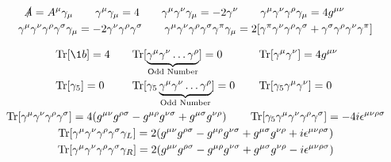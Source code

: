 \begin{gather*}
    \slashed{A} = A^\mu\gamma_\mu
    \qquad
    \gamma^\mu\gamma_\mu = 4
    \qquad
    \gamma^\mu\gamma^\nu\gamma_\mu = -2\gamma^\nu
    \qquad
    \gamma^\mu\gamma^\nu\gamma^\rho\gamma_\mu = 4g^{\mu\nu}
    \qquad
    \\
    \gamma^\mu\gamma^\nu\gamma^\rho\gamma^\sigma\gamma_\mu = -2\gamma^\nu\gamma^\rho\gamma^\sigma
    \qquad
    \gamma^\mu\gamma^\nu\gamma^\rho\gamma^\sigma\gamma^\pi\gamma_\mu = 2\qty[\gamma^\pi\gamma^\nu\gamma^\rho\gamma^\sigma + \gamma^\sigma\gamma^\rho\gamma^\nu\gamma^\pi]
\end{gather*}

\begin{gather*}
    \begin{alignedat}{3}
        &\Tr[\1b] = 4
        \qquad
        &&\mathrm{Tr}[\underbrace{\gamma^\mu\gamma^\nu\dots\gamma^\rho}_{\mathclap{\text{Odd Number}}}] = 0
        \qquad
        &&\Tr[\gamma^\mu\gamma^\nu] = 4g^{\mu\nu}
        \\
        &\Tr[\gamma_5] = 0
        \qquad
        &&\mathrm{Tr}[\gamma_5\underbrace{\gamma^\mu\gamma^\nu\dots\gamma^\rho}_{\mathclap{\text{Odd Number}}}] = 0
        \qquad
        &&\Tr[\gamma_5\gamma^\mu\gamma^\nu] = 0
    \end{alignedat}
    \\
    \Tr[\gamma^\mu\gamma^\nu\gamma^\rho\gamma^\sigma] = 4\qty(g^{\mu\nu}g^{\rho\sigma} - g^{\mu\rho}g^{\nu\sigma} + g^{\mu\sigma}g^{\nu\rho})
    \qquad
    \Tr[\gamma_5\gamma^\mu\gamma^\nu\gamma^\rho\gamma^\sigma] = -4i\epsilon^{\mu\nu\rho\sigma}
    \\
    \Tr[\gamma^\mu\gamma^\nu\gamma^\rho\gamma^\sigma\gamma_L] = 2\qty(g^{\mu\nu}g^{\rho\sigma} - g^{\mu\rho}g^{\nu\sigma} + g^{\mu\sigma}g^{\nu\rho} + i\epsilon^{\mu\nu\rho\sigma})
    \\
    \Tr[\gamma^\mu\gamma^\nu\gamma^\rho\gamma^\sigma\gamma_R] = 2\qty(g^{\mu\nu}g^{\rho\sigma} - g^{\mu\rho}g^{\nu\sigma} + g^{\mu\sigma}g^{\nu\rho} - i\epsilon^{\mu\nu\rho\sigma})
\end{gather*}
